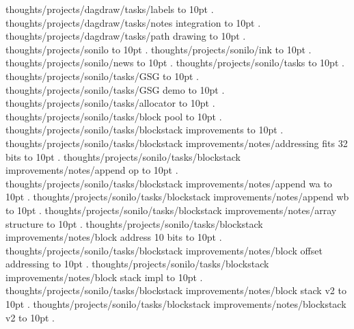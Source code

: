 \smallskip
thoughts/projects/dagdraw/tasks/labels \leaders\hbox to 10pt {\hss.\hss}  \hfill {}
\smallskip
thoughts/projects/dagdraw/tasks/notes integration \leaders\hbox to 10pt {\hss.\hss}  \hfill {}
\smallskip
thoughts/projects/dagdraw/tasks/path drawing \leaders\hbox to 10pt {\hss.\hss}  \hfill {}
\smallskip
thoughts/projects/sonilo \leaders\hbox to 10pt {\hss.\hss}  \hfill {}
\smallskip
thoughts/projects/sonilo/ink \leaders\hbox to 10pt {\hss.\hss}  \hfill {}
\smallskip
thoughts/projects/sonilo/news \leaders\hbox to 10pt {\hss.\hss}  \hfill {}
\smallskip
thoughts/projects/sonilo/tasks \leaders\hbox to 10pt {\hss.\hss}  \hfill {}
\smallskip
thoughts/projects/sonilo/tasks/GSG \leaders\hbox to 10pt {\hss.\hss}  \hfill {}
\smallskip
thoughts/projects/sonilo/tasks/GSG demo \leaders\hbox to 10pt {\hss.\hss}  \hfill {}
\smallskip
thoughts/projects/sonilo/tasks/allocator \leaders\hbox to 10pt {\hss.\hss}  \hfill {}
\smallskip
thoughts/projects/sonilo/tasks/block pool \leaders\hbox to 10pt {\hss.\hss}  \hfill {}
\smallskip
thoughts/projects/sonilo/tasks/blockstack improvements \leaders\hbox to 10pt {\hss.\hss}  \hfill {}
\smallskip
thoughts/projects/sonilo/tasks/blockstack improvements/notes/addressing fits 32 bits \leaders\hbox to 10pt {\hss.\hss}  \hfill {}
\smallskip
thoughts/projects/sonilo/tasks/blockstack improvements/notes/append op \leaders\hbox to 10pt {\hss.\hss}  \hfill {}
\smallskip
thoughts/projects/sonilo/tasks/blockstack improvements/notes/append wa \leaders\hbox to 10pt {\hss.\hss}  \hfill {}
\smallskip
thoughts/projects/sonilo/tasks/blockstack improvements/notes/append wb \leaders\hbox to 10pt {\hss.\hss}  \hfill {}
\smallskip
thoughts/projects/sonilo/tasks/blockstack improvements/notes/array structure \leaders\hbox to 10pt {\hss.\hss}  \hfill {}
\smallskip
thoughts/projects/sonilo/tasks/blockstack improvements/notes/block address 10 bits \leaders\hbox to 10pt {\hss.\hss}  \hfill {}
\smallskip
thoughts/projects/sonilo/tasks/blockstack improvements/notes/block offset addressing \leaders\hbox to 10pt {\hss.\hss}  \hfill {}
\smallskip
thoughts/projects/sonilo/tasks/blockstack improvements/notes/block stack impl \leaders\hbox to 10pt {\hss.\hss}  \hfill {}
\smallskip
thoughts/projects/sonilo/tasks/blockstack improvements/notes/block stack v2 \leaders\hbox to 10pt {\hss.\hss}  \hfill {}
\smallskip
thoughts/projects/sonilo/tasks/blockstack improvements/notes/blockstack v2 \leaders\hbox to 10pt {\hss.\hss}  \hfill {}
